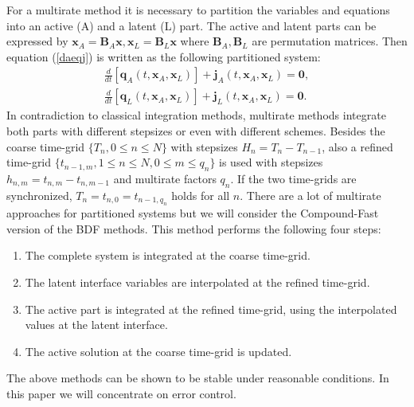 \documentclass{report}
\begin{document}
For a multirate method it is necessary to partition the variables and
equations into an active (A) and a latent (L) part.
The active and latent parts can be expressed by
$\mathbf{x}_A = \mathbf{B}_A \mathbf{x},\mathbf{x}_L = \mathbf{B}_L \mathbf{x}$ where
$\mathbf{B}_A,\mathbf{B}_L$ are permutation matrices.
Then equation (\ref{daeqj}) is written as the following partitioned system:
\begin{equation}\label{part_DAE}
\begin{array}{c}
\frac{d}{dt}\left [\mathbf{q}_{A}(t,\mathbf{x}_A,\mathbf{x}_L)\right
]+\mathbf{j}_{A}(t,\mathbf{x}_A,\mathbf{x}_L)=\mathbf{0},\\
\frac{d}{dt}\left [\mathbf{q}_{L}(t,\mathbf{x}_A,\mathbf{x}_L)\right
]+\mathbf{j}_{L}(t,\mathbf{x}_A,\mathbf{x}_L)=\mathbf{0}.
\end{array}
\end{equation}
In contradiction to classical integration methods, multirate methods
integrate both parts with different stepsizes or even with different
schemes.
Besides the coarse time-grid $\{T_n,0\leq n \leq N\}$ with stepsizes $H_n
= T_n - T_{n-1}$, also a refined time-grid $\{t_{n-1,m},1\leq n \leq N, 0
\leq m \leq q_n\}$ is used with stepsizes $h_{n,m} = t_{n,m} - t_{n,m-1}$
and multirate factors $q_n$. If the two time-grids are synchronized,
$T_n= t_{n,0} = t_{n-1,q_n}$ holds for all $n$.
There are a lot of multirate approaches for partitioned systems
but we will consider the Compound-Fast version of the BDF methods.
This method performs the following four steps:
\begin{enumerate}
\item The complete system is integrated at the coarse time-grid.
\item The latent interface variables are interpolated at the refined time-grid.
\item The active part is integrated at the refined time-grid, using the
interpolated values at the latent interface.
\item The active solution at the coarse time-grid is updated.
\end{enumerate}
The above methods can be shown to be stable under reasonable conditions.
In this paper we will concentrate on error control.
\end{document}

